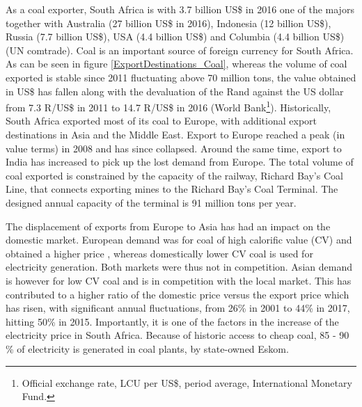 \documentclass[12pt,english]{article}
\begin{document}
As a coal exporter, South Africa is with 3.7 billion US\$ in 2016 one of the majors together with Australia (27 billion US\$ in 2016), Indonesia (12 billion US\$), Russia (7.7 billion US\$), USA (4.4 billion US\$) and Columbia (4.4 billion US\$) (UN comtrade). Coal is an important source of foreign currency for South Africa. %
As can be seen in figure \ref{ExportDestinations_Coal}, whereas the volume of coal exported is stable since 2011 fluctuating above 70 million tons, the value obtained in US\$ has fallen along with the devaluation of the Rand against the US dollar from 7.3 R/US\$ in 2011 to 14.7 R/US\$ in 2016 (World Bank\footnote{Official exchange rate, LCU per US\$, period average, International Monetary Fund.}). Historically, South Africa exported most of its coal to Europe, with additional export destinations in Asia and the Middle East. Export to Europe reached a peak (in value terms) in 2008 and has since collapsed. Around the same time, export to India has increased to pick up the lost demand from Europe. The total volume of coal exported is constrained by the capacity of the railway, Richard Bay's Coal Line, that connects exporting mines to the Richard Bay's Coal Terminal. The designed annual capacity of the terminal is 91 million tons per year.

The displacement of exports from Europe to Asia has had an impact on the domestic market. European demand was for coal of high calorific value (CV) and obtained a higher price \citep{burton2018coal}, whereas domestically lower CV coal is used for electricity generation. Both markets were thus not in competition. Asian demand is however for low CV coal and is in competition with the local market. This has contributed to a higher ratio of the domestic price versus the export price which has risen, with significant annual fluctuations, from 26\% in 2001 to 44\% in 2017, hitting 50\% in 2015. Importantly, it is one of the factors in the increase of the electricity price in South Africa. Because of historic access to cheap coal, 85 - 90 \% of electricity is generated in coal plants, by state-owned Eskom.
\end{document}
